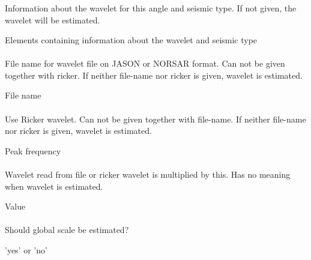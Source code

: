 \subsubsection{}
 \slist
   \item \Description Information about the wavelet for this angle and seismic type. If not given, the wavelet will be estimated.
   \item \Argument Elements containing information about the wavelet and seismic type
   \item \Default
 \elist

\paragraph{}
 \slist
   \item \Description File name for wavelet file on JASON or NORSAR format. Can not be given together with ricker. If neither file-name nor ricker is given, wavelet is estimated.
   \item \Argument File name
   \item \Default
 \elist

\paragraph{}
 \slist
   \item \Description Use Ricker wavelet. Can not be given together with file-name. If neither file-name nor ricker is given, wavelet is estimated.
   \item \Argument Peak frequency
   \item \Default
 \elist

\paragraph{}
 \slist
   \item \Description Wavelet read from file or ricker wavelet is multiplied by this. Has no meaning when wavelet is estimated.
   \item \Argument Value
   \item \Default
 \elist

\paragraph{}
 \slist
   \item \Description Should global scale be estimated?
   \item \Argument 'yes' or 'no'
   \item \Default
 \elist

